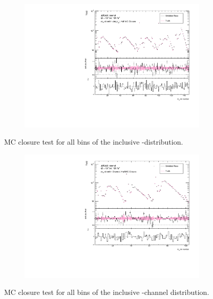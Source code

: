 \begin{figure}[htb]
  \centering
  \begin{subfigure}{.65\textwidth}\centering\includegraphics[width = 0.99\textwidth]{Figures/m4l/UnfoldingStudies/v014_closure/HalfMCClosure_withPull_m4l_y4l.pdf}\end{subfigure}
\caption{MC closure test for all bins of the inclusive \mFourL-\yFourL distribution.}
 \end{figure}

\begin{figure}[htb]
  \centering
  \begin{subfigure}{.65\textwidth}\centering\includegraphics[width = 0.99\textwidth]{Figures/m4l/UnfoldingStudies/v014_closure/HalfMCClosure_withPull_m4l_event_type.pdf}\end{subfigure}
\caption{MC closure test for all bins of the inclusive \mFourL-channel distribution.}
 \end{figure}

